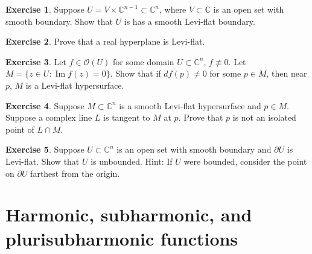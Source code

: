 \documentclass[12pt,openany]{book}
\renewcommand{\Im}{\operatorname{Im}}
\newcommand{\C}{{\mathbb{C}}}
\newcommand{\sO}{{\mathscr{O}}}
\theoremstyle{plain}
\theoremstyle{remark}
\theoremstyle{definition}
\newenvironment{exbox}{%
    \def\FrameCommand{\vrule width 1pt \relax\hspace {10pt}}%
    \MakeFramed {\advance \hsize -\width \FrameRestore }%
}{%
    \endMakeFramed
}
\theoremstyle{exercise}
\newtheorem{exercise}{Exercise}[section]
\theoremstyle{example}
\begin{document}
\begin{exbox}
\begin{exercise}
Suppose $U = V \times \C^{n-1} \subset \C^n$, where $V \subset \C$ is an
open set with smooth boundary.  Show that $U$ is has a smooth Levi-flat boundary.
\end{exercise}

\begin{exercise}
Prove that a real hyperplane is Levi-flat.
\end{exercise}

\begin{exercise}
Let $f \in \sO(U)$ for some domain $U \subset \C^n$, $f \not\equiv 0$.
Let $M = \bigl\{ z \in U : \Im f(z) = 0 \bigr\}$.  Show that
if $df(p) \not=0$ for some $p \in M$, then near $p$,
$M$ is a Levi-flat hypersurface.
\end{exercise}


\begin{exercise}
Suppose $M \subset \C^n$ is a smooth Levi-flat hypersurface
and $p \in M$.
Suppose a complex line $L$ is tangent to $M$ at $p$.
Prove that $p$ is not an isolated point of $L \cap M$.
\end{exercise}

\begin{exercise}
Suppose $U \subset \C^n$ is an open set with smooth boundary
and $\partial U$ is Levi-flat.
Show that $U$ is unbounded.
Hint: If $U$ were bounded, consider the point on $\partial U$ farthest from
the origin.
\end{exercise}
\end{exbox}


\section{Harmonic, subharmonic, and plurisubharmonic functions}
\label{sec:harmonic}

\end{document}
